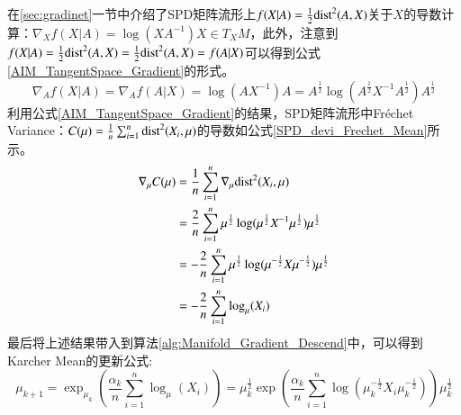 在\ref{sec:gradinet}一节中介绍了SPD矩阵流形上$f(X|A)=\frac{1}{2}{\rm dist}^{2}(A,X)$关于$X$的导数计算：$\nabla_X f(X|A)=\log(XA^{-1})X \in T_{X}M$，此外，注意到$f(X|A)=\frac{1}{2}{\rm dist}^{2}(A,X)=\frac{1}{2}{\rm dist}^{2}(A,X)=f(A|X)$可以得到公式\ref{AIM_TangentSpace_Gradient}的形式。
\begin{equation}
\label{AIM_TangentSpace_Gradient}
\nabla_A f(X|A)=\nabla_A f(A|X)=\log(AX^{-1})A=A^{\frac{1}{2}}\log(A^{\frac{1}{2}}X^{-1}A^{\frac{1}{2}})A^{\frac{1}{2}}
\end{equation}
利用公式\ref{AIM_TangentSpace_Gradient}的结果，SPD矩阵流形中Fr\'echet Variance：$C(\mu)=\frac{1}{n}\sum_{i=1}^{n}{\rm dist}^{2}(X_{i},\mu)$的导数如公式\ref{SPD_devi_Frechet_Mean}所示。
\begin{equation}
\label{SPD_devi_Frechet_Mean}
\begin{split}
\nabla_{\mu} C(\mu)&=\frac{1}{n}\sum_{i=1}^{n}\nabla_{\mu}{\rm dist}^{2}(X_{i},\mu)\\
&=\frac{2}{n}\sum_{i=1}^{n}{\mu}^{\frac{1}{2}}\log({\mu}^{\frac{1}{2}}X^{-1}{\mu}^{\frac{1}{2}}){\mu}^{\frac{1}{2}}\\
&=-\frac{2}{n}\sum_{i=1}^{n}{\mu}^{\frac{1}{2}}\log({\mu}^{-\frac{1}{2}}X{\mu}^{-\frac{1}{2}}){\mu}^{\frac{1}{2}}\\
&=-\frac{2}{n}\sum_{i=1}^{n}\log_{\mu}(X_{i})
\end{split}
\end{equation}
最后将上述结果带入到算法\ref{alg:Manifold_Gradient_Descend}中，可以得到Karcher Mean的更新公式:
\begin{equation}
\label{AIM_Karcher_Mean}
\mu_{k+1}=\exp_{\mu_{k}}(\frac{\alpha_{k}}{n}\sum_{i=1}^{n}\log_{\mu}(X_{i}))={\mu}^{\frac{1}{2}}_{k}\exp(\frac{\alpha_{k}}{n}\sum_{i=1}^{n}\log({\mu}^{-\frac{1}{2}}_{k}X_{i}{\mu}^{-\frac{1}{2}}_{k})){\mu}^{\frac{1}{2}}_{k}
\end{equation}

